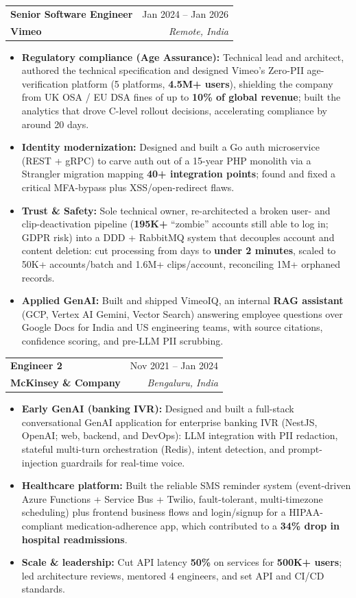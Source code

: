 \documentclass[letterpaper,10pt]{article}
\makeatletter
\newcommand{\resumeItem}[1]{
  \item\small{
    {#1 \vspace{-2pt}}
  }
}
\newcommand{\resumeSubheading}[4]{
  \vspace{-2pt}\item
    \begin{tabular*}{0.97\textwidth}[t]{l@{\extracolsep{\fill}}r}
      \textbf{#1} & #2 \\
      \textbf{\small \textcolor{accent}{#3}} & \textit{\small #4} \\
    \end{tabular*}\vspace{-7pt}
}
\newcommand{\resumeItemListStart}{\begin{itemize}[itemsep=1pt, topsep=3pt, parsep=0pt, partopsep=0pt, leftmargin=0.18in]}
\newcommand{\resumeItemListEnd}{\end{itemize}\vspace{-2pt}}
\makeatother
\begin{document}
    \resumeSubheading
      {Senior Software Engineer}{Jan 2024 -- Jan 2026}
      {Vimeo}{Remote, India}
      \resumeItemListStart
        \resumeItem{\textbf{Regulatory compliance (Age Assurance):} Technical lead and architect, authored the technical specification and designed Vimeo's Zero-PII age-verification platform (5 platforms, \textbf{4.5M+ users}), shielding the company from UK OSA / EU DSA fines of up to \textbf{10\% of global revenue}; built the analytics that drove C-level rollout decisions, accelerating compliance by around 20 days.}
        \resumeItem{\textbf{Identity modernization:} Designed and built a Go auth microservice (REST + gRPC) to carve auth out of a 15-year PHP monolith via a Strangler migration mapping \textbf{40+ integration points}; found and fixed a critical MFA-bypass plus XSS/open-redirect flaws.}
        \resumeItem{\textbf{Trust \& Safety:} Sole technical owner, re-architected a broken user- and clip-deactivation pipeline (\textbf{195K+} ``zombie'' accounts still able to log in; GDPR risk) into a DDD + RabbitMQ system that decouples account and content deletion: cut processing from days to \textbf{under 2 minutes}, scaled to 50K+ accounts/batch and 1.6M+ clips/account, reconciling 1M+ orphaned records.}
        \resumeItem{\textbf{Applied GenAI:} Built and shipped VimeoIQ, an internal \textbf{RAG assistant} (GCP, Vertex AI Gemini, Vector Search) answering employee questions over Google Docs for India and US engineering teams, with source citations, confidence scoring, and pre-LLM PII scrubbing.}
      \resumeItemListEnd

    \resumeSubheading
      {Engineer 2}{Nov 2021 -- Jan 2024}
      {McKinsey \& Company}{Bengaluru, India}
      \resumeItemListStart
        \resumeItem{\textbf{Early GenAI (banking IVR):} Designed and built a full-stack conversational GenAI application for enterprise banking IVR (NestJS, OpenAI; web, backend, and DevOps): LLM integration with PII redaction, stateful multi-turn orchestration (Redis), intent detection, and prompt-injection guardrails for real-time voice.}
        \resumeItem{\textbf{Healthcare platform:} Built the reliable SMS reminder system (event-driven Azure Functions + Service Bus + Twilio, fault-tolerant, multi-timezone scheduling) plus frontend business flows and login/signup for a HIPAA-compliant medication-adherence app, which contributed to a \textbf{34\% drop in hospital readmissions}.}
        \resumeItem{\textbf{Scale \& leadership:} Cut API latency \textbf{50\%} on services for \textbf{500K+ users}; led architecture reviews, mentored 4 engineers, and set API and CI/CD standards.}
      \resumeItemListEnd
\end{document}
